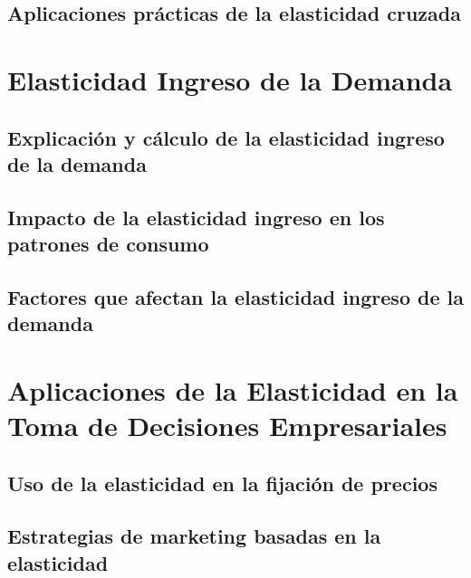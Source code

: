 \documentclass[
  jou,
  floatsintext,
  longtable,
  a4paper,
  nolmodern,
  notxfonts,
  notimes,
  12pt,
  colorlinks=true,linkcolor=blue,citecolor=blue,urlcolor=blue]{apa7}
\begin{document}
\subsection{Aplicaciones prácticas de la elasticidad
cruzada}\label{aplicaciones-pruxe1cticas-de-la-elasticidad-cruzada}

\section{Elasticidad Ingreso de la
Demanda}\label{elasticidad-ingreso-de-la-demanda}

\subsection{Explicación y cálculo de la elasticidad ingreso de la
demanda}\label{explicaciuxf3n-y-cuxe1lculo-de-la-elasticidad-ingreso-de-la-demanda}

\subsection{Impacto de la elasticidad ingreso en los patrones de
consumo}\label{impacto-de-la-elasticidad-ingreso-en-los-patrones-de-consumo}

\subsection{Factores que afectan la elasticidad ingreso de la
demanda}\label{factores-que-afectan-la-elasticidad-ingreso-de-la-demanda}

\section{Aplicaciones de la Elasticidad en la Toma de Decisiones
Empresariales}\label{aplicaciones-de-la-elasticidad-en-la-toma-de-decisiones-empresariales}

\subsection{Uso de la elasticidad en la fijación de
precios}\label{uso-de-la-elasticidad-en-la-fijaciuxf3n-de-precios}

\subsection{Estrategias de marketing basadas en la
elasticidad}\label{estrategias-de-marketing-basadas-en-la-elasticidad}
\end{document}
